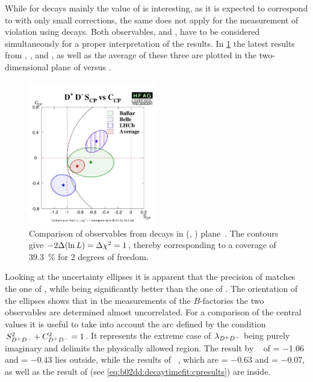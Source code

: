 While for \BdToJPsiKS decays mainly the value of \SJpsiKS is interesting, as
it is expected to correspond to \sintwobeta with only small corrections, the
same does not apply for the measurement of \CP violation using \BdToDD decays.
Both observables, \SDD and \CDD, have to be considered simultaneously for a
proper interpretation of the results. In \cref{fig:discussion:b2ddcomparison}
the latest results from \babar, \belle, and \lhcb, as well as the average of
these three are plotted in the two-dimensional plane of \CDD versus \SDD.
\begin{figure}[htb]
\centering
\includegraphics[width=0.5\textwidth]{08-Discussion/figs/D+D-S_CPvsC_CP.pdf}
\caption{Comparison of \CP observables from \mbox{\BdToDD} decays in (\SDD,
\CDD) plane~\cite{HFAG}. The contours give $-2\Delta(\ln L) = \Delta\chi^2 =
1$, thereby corresponding to a coverage of \SI{39.3}{\percent} for 2 degrees
of freedom.}
\label{fig:discussion:b2ddcomparison}
\end{figure}
Looking at the uncertainty ellipses it is apparent that the precision of \lhcb
matches the one of \belle, while being significantly better than the one of
\babar. The orientation of the ellipses shows that in the measurements of the
$B$-factories the two \CP observables are determined almost uncorrelated. For
a comparison of the central values it is useful to take into account the arc
defined by the condition $S_{{{D}^+}{{D}^-}}^2+C_{{{D}^+}{{D}^-}}^2=1$. It represents the extreme case of
$\lambda_{{{D}^+}{{D}^-}}$ being purely imaginary and delimits the physically allowed
region. The result by \belle~\cite{Rohrken:2012ta} of \SDD = \num{-1.06} and
\CDD = \num{-0.43} lies outside, while the results of
\babar~\cite{Aubert:2008ah}, which are \SDD = \num{-0.63} and \CDD =
\num{-0.07}, as well as the result of \lhcb (see
\cref{eq:b02dd:decaytimefit:cpresults}) are inside.
